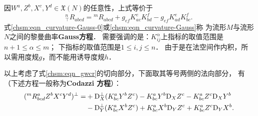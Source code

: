 \setlength{\mathindent}{2em}
因$W^a, Z^b, X^c, Y^d \in \mathfrak{X}(N)$的任意性，上式等价于
\begin{equation}\label{chsm:eqn_curvature-Gauss}
    {}^{n}_{\top}{R}_{abcd} = {}^{m}{R}_{abcd} +{g}_{ef} K^e_{ac} K^f_{bd} -{g}_{ef} K^e_{ad}K^f_{bc} .
\end{equation}
式\eqref{chsm:eqn_curvature-Gauss-0}或\eqref{chsm:eqn_curvature-Gauss}称
为流形$M$与流形$N$之间的黎曼曲率{\heiti \bfseries Gauss方程}．
需要强调的是：$K^\alpha_{ij}$上指标的取值范围是$n+1\leqslant \alpha \leqslant {m}$；
下指标的取值范围是$1\leqslant i,j \leqslant n$．%
由于是在法空间作内积，所以需用度规${g}$，而不能用诱导度规$h$．

以上考虑了式\eqref{chsm:eqn_gwcr}的切向部分，下面取其等号两侧的法向部分，
有（下述方程一般称为{\heiti \bfseries Codazzi 方程}）：
\setlength{\mathindent}{0em}
\begin{equation}\label{chsm:eqn_Codazzi}
\begin{aligned}
    ({}^{m}{R}^a_{bcd} Z^b X^c Y^d)^\bot =&+
      {\rm D}^\bot_{X} (K^{a}_{bc} Y^b Z^c) - K^{a}_{bc}Y^b {\rm D}_{X}Z^c - K^a_{bc} Z^c {\rm D}_{X} Y^b  \\
   &- {\rm D}^\bot_{Y} (K^{a}_{bc} X^b Z^c) + K^{a}_{bc}X^b {\rm D}_{Y}Z^c + K^a_{bc} Z^c {\rm D}_{Y} X^b .
\end{aligned}
\end{equation}
\setlength{\mathindent}{2em}





